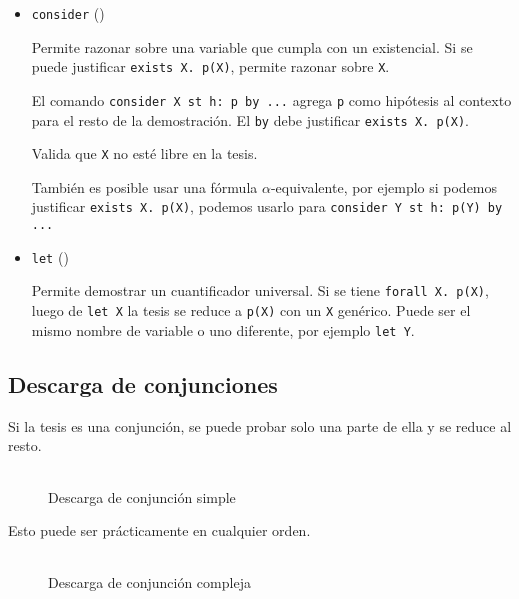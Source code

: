\begin{itemize}
    \item \lstinline{consider} ()
    
    Permite razonar sobre una variable que cumpla con un existencial. Si se
    puede justificar \lstinline{exists X. p(X)}, permite razonar sobre
    \lstinline{X}.

    El comando \lstinline{consider X st h: p by ...} agrega \lstinline{p} como
    hipótesis al contexto para el resto de la demostración. El \lstinline{by}
    debe justificar \lstinline{exists X. p(X)}.

    Valida que \lstinline{X} no esté libre en la tesis.

    También es posible usar una fórmula $\alpha$-equivalente, por
    ejemplo si podemos justificar \lstinline{exists X. p(X)}, podemos usarlo
    para \lstinline{consider Y st h: p(Y) by ...}

    \item \lstinline{let} ()
    
    Permite demostrar un cuantificador universal. Si se tiene
    \lstinline{forall X. p(X)}, luego de \lstinline{let X} la tesis se reduce a
    \lstinline{p(X)} con un \lstinline{X} genérico. Puede ser el mismo nombre de
    variable o uno diferente, por ejemplo \lstinline{let Y}.

\end{itemize}

\subsection{Descarga de conjunciones}\label{ppa:sec:and-intro}

Si la tesis es una conjunción, se puede probar solo una parte de ella y se
reduce al resto.

\begin{figure}[H]
    \centering
    \caption{Descarga de conjunción simple}
    \begin{tabular}{c}
        
    \end{tabular}
\end{figure}

Esto puede ser prácticamente en cualquier orden.

\begin{figure}[H]
    \centering
    \caption{Descarga de conjunción compleja}
    \begin{tabular}{c}
    
    \end{tabular}
\end{figure}


